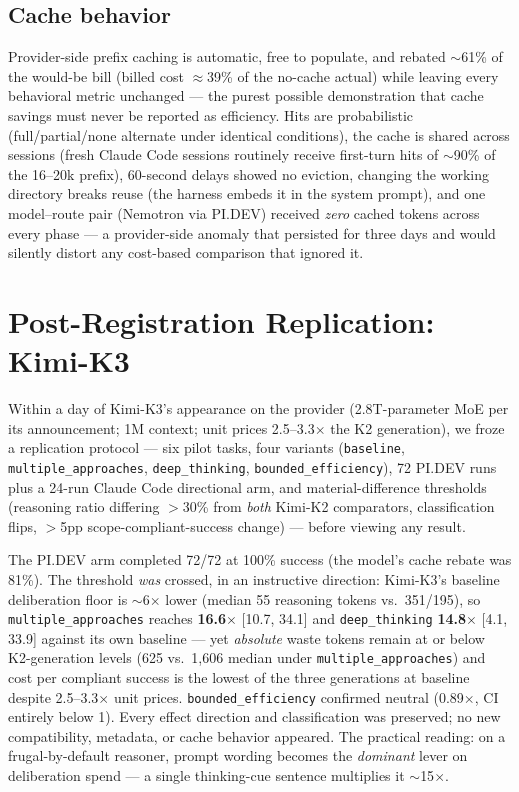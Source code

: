 \documentclass[11pt]{article}
\newcommand{\pidev}{PI.DEV}
\newcommand{\cc}{Claude Code}
\newcommand{\xd}{$\times$}
\begin{document}
\subsection{Cache behavior}

Provider-side prefix caching is automatic, free to populate, and rebated
$\sim$61\% of the would-be bill (billed cost $\approx$39\% of the no-cache
actual) while leaving every behavioral metric unchanged --- the purest
possible demonstration that cache savings must never be reported as
efficiency. Hits are probabilistic (full/partial/none alternate under
identical conditions), the cache is shared across sessions (fresh \cc{}
sessions routinely receive first-turn hits of $\sim$90\% of the 16--20k
prefix), 60-second delays showed no eviction, changing the working
directory breaks reuse (the harness embeds it in the system prompt), and
one model--route pair (Nemotron via \pidev) received \emph{zero} cached
tokens across every phase --- a provider-side anomaly that persisted for
three days and would silently distort any cost-based comparison that
ignored it.

\section{Post-Registration Replication: Kimi-K3}

Within a day of Kimi-K3's appearance on the provider (2.8T-parameter MoE
per its announcement; 1M context; unit prices 2.5--3.3\xd{} the K2 generation), we froze a
replication protocol --- six pilot tasks, four variants
(\texttt{baseline}, \texttt{multiple\_approaches},
\texttt{deep\_thinking}, \texttt{bounded\_efficiency}), 72 \pidev{} runs
plus a 24-run \cc{} directional arm, and material-difference thresholds
(reasoning ratio differing $>$30\% from \emph{both} Kimi-K2 comparators,
classification flips, $>$5pp scope-compliant-success change) --- before
viewing any result.

The \pidev{} arm completed 72/72 at 100\% success (the
model's cache rebate was 81\%). The threshold \emph{was} crossed, in an
instructive direction: Kimi-K3's baseline deliberation floor is
$\sim$6\xd{} lower (median 55 reasoning tokens vs.\ 351/195), so
\texttt{multiple\_approaches} reaches \textbf{16.6\xd} [10.7, 34.1] and
\texttt{deep\_thinking} \textbf{14.8\xd} [4.1, 33.9] against its own
baseline --- yet \emph{absolute} waste tokens remain at or below
K2-generation levels (625 vs.\ 1{,}606 median under
\texttt{multiple\_approaches}) and cost per compliant success is the
lowest of the three generations at baseline despite
2.5--3.3\xd{} unit prices. \texttt{bounded\_efficiency} confirmed neutral
(0.89\xd, CI entirely below 1). Every effect direction and classification
was preserved; no new compatibility, metadata, or cache behavior appeared.
The practical reading: on a frugal-by-default reasoner, prompt wording
becomes the \emph{dominant} lever on deliberation spend --- a single
thinking-cue sentence multiplies it $\sim$15\xd.
\end{document}
